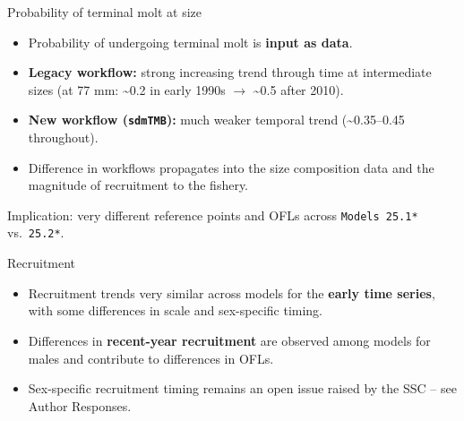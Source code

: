 \documentclass[
  10pt,
  ignorenonframetext,
  aspectratio=169,
]{beamer}
\providecommand{\tightlist}{%
  \setlength{\itemsep}{0pt}\setlength{\parskip}{0pt}}
\begin{document}
\begin{frame}[fragile]{Probability of terminal molt at size}
\label{probability-of-terminal-molt-at-size}
\small

\begin{itemize}
\tightlist
\item
  Probability of undergoing terminal molt is \textbf{input as data}.
\item
  \textbf{Legacy workflow:} strong increasing trend through time at
  intermediate sizes (at 77 mm: \textasciitilde0.2 in early 1990s
  \(\to\) \textasciitilde0.5 after 2010).
\item
  \textbf{New workflow (\texttt{sdmTMB}):} much weaker temporal trend
  (\textasciitilde0.35--0.45 throughout).
\item
  Difference in workflows propagates into the size composition data and
  the magnitude of recruitment to the fishery.
\end{itemize}

\medskip

\centering Implication: very different reference points and OFLs across
\texttt{Models\ 25.1*} vs.~\texttt{25.2*}.
\end{frame}

\begin{frame}{Recruitment}
\label{recruitment}
\small

\begin{itemize}
\tightlist
\item
  Recruitment trends very similar across models for the \textbf{early
  time series}, with some differences in scale and sex-specific timing.
\item
  Differences in \textbf{recent-year recruitment} are observed among
  models for males and contribute to differences in OFLs.
\item
  Sex-specific recruitment timing remains an open issue raised by the
  SSC -- see Author Responses.
\end{itemize}
\end{frame}
\end{document}
